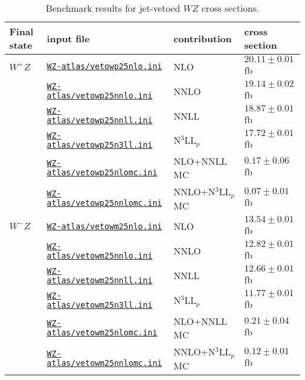 \renewcommand{\arraystretch}{1.05}
\begin{table}
\begin{tabular}{llll}
\hline
Final state & input file & contribution & cross section \\
\hline
\hline
$W^+Z$
& \href{\mcfmprocs/Files71/jetveto/atlas/vetowp25nlo.ini}{\texttt{WZ-atlas/vetowp25nlo.ini}}        & NLO                 & $20.11 \pm 0.01$ fb \\
& \href{\mcfmprocs/Files71/jetveto/atlas/vetowp25nnlo.ini}{\texttt{WZ-atlas/vetowp25nnlo.ini}}      & NNLO                & $19.14 \pm 0.02$ fb \\
& \href{\mcfmprocs/Files71/jetveto/atlas/vetowp25nnll.ini}{\texttt{WZ-atlas/vetowp25nnll.ini}}      & NNLL                & $18.87 \pm 0.01$ fb \\
& \href{\mcfmprocs/Files71/jetveto/atlas/vetowp25n3ll.ini}{\texttt{WZ-atlas/vetowp25n3ll.ini}}      & N$^3$LL$_p$         & $17.72 \pm 0.01$ fb \\
& \href{\mcfmprocs/Files71/jetveto/atlas/vetowp25nlomc.ini}{\texttt{WZ-atlas/vetowp25nlomc.ini}}    & NLO+NNLL MC         & $0.17 \pm 0.06$ fb \\
& \href{\mcfmprocs/Files71/jetveto/atlas/vetowp25nnlomc.ini}{\texttt{WZ-atlas/vetowp25nnlomc.ini}}  & NNLO+N$^3$LL$_p$ MC & $0.07 \pm 0.01$ fb \\[2pt]
\hline
$W^-Z$
& \href{\mcfmprocs/Files76/jetveto/atlas/vetowm25nlo.ini}{\texttt{WZ-atlas/vetowm25nlo.ini}}        & NLO                 & $13.54 \pm 0.01$ fb \\
& \href{\mcfmprocs/Files76/jetveto/atlas/vetowm25nnlo.ini}{\texttt{WZ-atlas/vetowm25nnlo.ini}}      & NNLO                & $12.82 \pm 0.01$ fb \\
& \href{\mcfmprocs/Files76/jetveto/atlas/vetowm25nnll.ini}{\texttt{WZ-atlas/vetowm25nnll.ini}}      & NNLL                & $12.66 \pm 0.01$ fb \\
& \href{\mcfmprocs/Files76/jetveto/atlas/vetowm25n3ll.ini}{\texttt{WZ-atlas/vetowm25n3ll.ini}}      & N$^3$LL$_p$         & $11.77 \pm 0.01$ fb \\
& \href{\mcfmprocs/Files76/jetveto/atlas/vetowm25nlomc.ini}{\texttt{WZ-atlas/vetowm25nlomc.ini}}    & NLO+NNLL MC         & $0.21 \pm 0.04$ fb \\
& \href{\mcfmprocs/Files76/jetveto/atlas/vetowm25nnlomc.ini}{\texttt{WZ-atlas/vetowm25nnlomc.ini}}  & NNLO+N$^3$LL$_p$ MC & $0.12 \pm 0.01$ fb \\[2pt]
\end{tabular}
\caption{Benchmark results for jet-vetoed $WZ$ cross sections.}
\label{table:jetveto_WZ-atlas}
\end{table}
\renewcommand{\arraystretch}{1.0}
